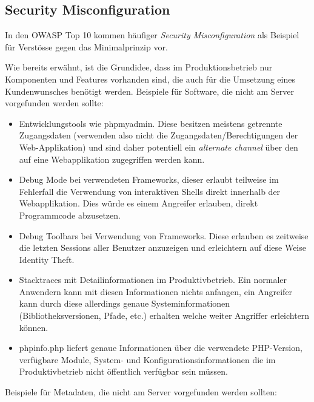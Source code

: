 \subsection{Security Misconfiguration}

In den OWASP Top 10 kommen häufiger \textit{Security Misconfiguration} als Beispiel für Verstösse gegen das Minimalprinzip vor.

Wie bereits erwähnt, ist die Grundidee, dass im Produktionsbetrieb nur Komponenten und Features vorhanden sind, die auch für die Umsetzung eines Kundenwunsches benötigt werden. Beispiele für Software, die nicht am Server vorgefunden werden sollte:

\begin{itemize}
	\item Entwicklungstools wie phpmyadmin. Diese besitzen meistens getrennte Zugangsdaten (verwenden also nicht die Zugangsdaten/Berechtigungen der Web-Applikation) und sind daher potentiell ein \textit{alternate channel} über den auf eine Webapplikation zugegriffen werden kann.
	\item Debug Mode bei verwendeten Frameworks, dieser erlaubt teilweise im Fehlerfall die Verwendung von interaktiven Shells direkt innerhalb der Webapplikation. Dies würde es einem Angreifer erlauben, direkt Programmcode abzusetzen.
	\item Debug Toolbars bei Verwendung von Frameworks. Diese erlauben es zeitweise die letzten Sessions aller Benutzer anzuzeigen und erleichtern auf diese Weise Identity Theft.
	\item Stacktraces mit Detailinformationen im Produktivbetrieb. Ein normaler Anwendern kann mit diesen Informationen nichts anfangen, ein Angreifer kann durch diese allerdings genaue Systeminformationen (Bibliotheksversionen, Pfade, etc.) erhalten welche weiter Angriffer erleichtern können.
	\item phpinfo.php liefert genaue Informationen über die verwendete PHP-Version, verfügbare Module, System- und Konfigurationsinformationen die im Produktivbetrieb nicht öffentlich verfügbar sein müssen.
\end{itemize}

Beispiele für Metadaten, die nicht am Server vorgefunden werden sollten:

